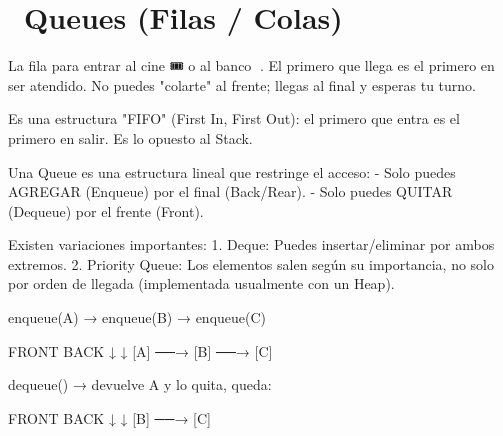 ﻿\chapter[\emj{🚌}~Queues (Filas / Colas)]{~Queues (Filas / Colas)}

\begin{dsaquees}

La fila para entrar al cine 🎟️ o al banco 🏦. El primero que llega 
es el primero en ser atendido. No puedes "colarte" al frente; llegas 
al final y esperas tu turno.

Es una estructura "FIFO" (First In, First Out): el primero que entra
es el primero en salir. Es lo opuesto al Stack.

\end{dsaquees}

\begin{dsaotraforma}

Una Queue es una estructura lineal que restringe el acceso:
- Solo puedes AGREGAR (Enqueue) por el final (Back/Rear).
- Solo puedes QUITAR (Dequeue) por el frente (Front).

Existen variaciones importantes:
1. Deque: Puedes insertar/eliminar por ambos extremos.
2. Priority Queue: Los elementos salen según su importancia, no 
   solo por orden de llegada (implementada usualmente con un Heap).

\end{dsaotraforma}

\begin{dsadiagrama}
enqueue(A) → enqueue(B) → enqueue(C)

FRONT                    BACK
  ↓                       ↓
 [A] ──→ [B] ──→ [C]

dequeue() → devuelve A y lo quita, queda:

FRONT         BACK
  ↓             ↓
 [B] ──→ [C]
\end{dsadiagrama}

